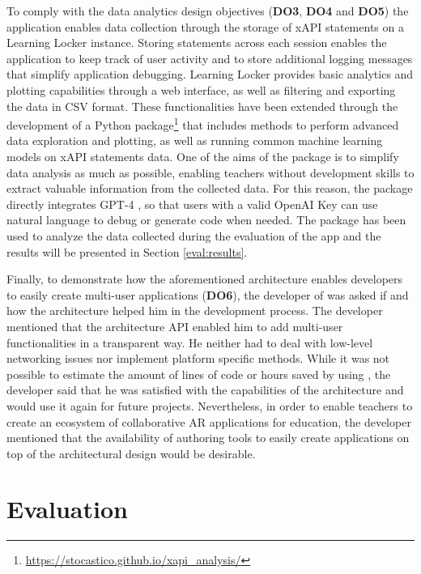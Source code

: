 To comply with the data analytics design objectives (\textbf{DO3}, \textbf{DO4} and \textbf{DO5}) the application enables data collection through the storage of xAPI statements on a Learning Locker instance. 
Storing statements across each session enables the application to keep track of user activity and to store additional logging messages that simplify application debugging.
Learning Locker provides basic analytics and plotting capabilities through a web interface, as well as filtering and exporting the data in CSV format.
These functionalities have been extended through the development of a Python package\footnote{\url{https://stocastico.github.io/xapi_analysis/}} that includes methods to perform advanced data exploration and plotting, as well as running common machine learning models on xAPI statements data.
One of the aims of the package is to simplify data analysis as much as possible, enabling teachers without development skills to extract valuable information from the collected data.
For this reason, the package directly integrates GPT-4 \citep{openai2023gpt4, Osmulski_Ask_AI_-_2023}, so that users with a valid OpenAI Key can use natural language to debug or generate code when needed.
The package has been used to analyze the data collected during the evaluation of the app and the results will be presented in Section \ref{eval:results}.

Finally, to demonstrate how the aforementioned architecture enables developers to easily create multi-user applications (\textbf{DO6}), the developer of \appname{} was asked if and how the architecture helped him in the development process.
The developer mentioned that the architecture API enabled him to add multi-user functionalities in a transparent way. He neither had to deal with low-level networking issues nor implement platform specific methods.
While it was not possible to estimate the amount of lines of code or hours saved by using \arch{}, the developer said that he was satisfied with the capabilities of the architecture and would use it again for future projects.
Nevertheless, in order to enable teachers to create an ecosystem of collaborative AR applications for education, the developer mentioned that the availability of authoring tools to easily create applications on top of the \arch{} architectural design would be desirable.


\section{Evaluation}\label{eval:evaluation}


